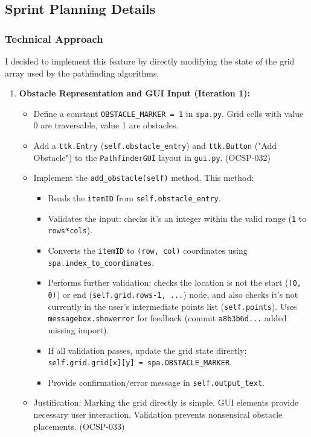 \clearpage
\subsection{Sprint Planning Details}

\subsubsection{Technical Approach}
I decided to implement this feature by directly modifying the state of the grid array used by the pathfinding algorithms.

\begin{enumerate}
	\item \textbf{Obstacle Representation and GUI Input (Iteration 1):}
	\begin{itemize}
		\item Define a constant \verb|OBSTACLE_MARKER = 1| in \verb|spa.py|. Grid cells with value 0 are traversable, value 1 are obstacles.
		\item Add a \verb|ttk.Entry| (\verb|self.obstacle_entry|) and \verb|ttk.Button| ("Add Obstacle") to the \verb|PathfinderGUI| layout in \verb|gui.py|. (OCSP-032)
		\item Implement the \verb|add_obstacle(self)| method. This method:
		\begin{itemize}
			\item Reads the \verb|itemID| from \verb|self.obstacle_entry|.
			\item Validates the input: checks it's an integer within the valid range (\verb|1| to \verb|rows*cols|).
			\item Converts the \verb|itemID| to \verb|(row, col)| coordinates using \verb|spa.index_to_coordinates|.
			\item Performs further validation: checks the location is not the start (\verb|(0, 0)|) or end (\verb|self.grid.rows-1, ...|) node, and also checks it's not currently in the user's intermediate points list (\verb|self.points|). Uses \verb|messagebox.showerror| for feedback (commit \verb|a8b3b6d...| added missing import).
			\item If all validation passes, update the grid state directly: \verb|self.grid.grid[x][y] = spa.OBSTACLE_MARKER|.
			\item Provide confirmation/error message in \verb|self.output_text|.
		\end{itemize}
		\item Justification: Marking the grid directly is simple. GUI elements provide necessary user interaction. Validation prevents nonsensical obstacle placements. (OCSP-033)

\end{itemize}
\end{enumerate}
